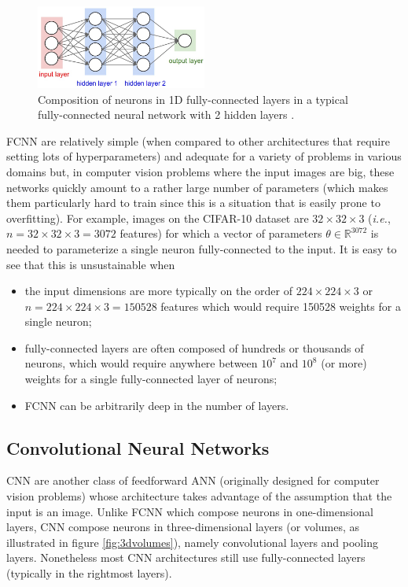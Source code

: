 \begin{figure}[ht]
    \centering
    \includegraphics[width=0.5\textwidth]{figs/1dlayers.png}
    \caption{Composition of neurons in 1D fully-connected layers in a typical fully-connected neural network with 2 hidden layers \cite{cs231n}.}
    \label{fig:1dlayers}
\end{figure}

\ac{FCNN} are relatively simple (when compared to other architectures that require setting lots of hyperparameters) and adequate for a variety of problems in various domains but, in computer vision problems where the input images are big, these networks quickly amount to a rather large number of parameters (which makes them particularly hard to train since this is a situation that is easily prone to overfitting). For example, images on the CIFAR-10 \cite{cifar10} dataset are $32 \times 32 \times 3$ (\textit{i.e.}, $n = 32 \times 32 \times 3 = 3072$ features) for which a vector of parameters $\theta \in \mathbb{R}^{3072}$ is needed to parameterize a single neuron fully-connected to the input. It is easy to see that this is unsustainable when

\begin{itemize}
    \item the input dimensions are more typically on the order of $224 \times 224 \times 3$ or $n = 224 \times 224 \times 3 = 150528$ features which would require 150528 weights for a single neuron;
    \item fully-connected layers are often composed of hundreds or thousands of neurons, which would require anywhere between $10^7$ and $10^8$ (or more) weights for a single fully-connected layer of neurons;
    \item \ac{FCNN} can be arbitrarily deep in the number of layers.
\end{itemize}

\subsection{Convolutional Neural Networks}

\ac{CNN} are another class of feedforward \ac{ANN} (originally designed for computer vision problems) whose architecture takes advantage of the assumption that the input is an image. Unlike \ac{FCNN} which compose neurons in one-dimensional layers, \ac{CNN} compose neurons in three-dimensional layers (or volumes, as illustrated in figure \ref{fig:3dvolumes}), namely convolutional layers and pooling layers. Nonetheless most \ac{CNN} architectures still use fully-connected layers (typically in the rightmost layers).

